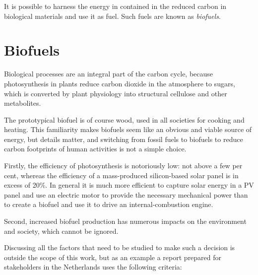It is possible to harness the energy in contained in the reduced carbon in
biological materials and use it as fuel. Such fuels are known as
\textit{biofuels}.

\section{Biofuels}

Biological processes are an integral part of the carbon cycle, because
photosynthesis in plants reduce carbon dioxide in the atmosphere to sugars,
which is converted by plant physiology into structural cellulose and other
metabolites.

The prototypical biofuel is of course wood, used in all societies for cooking
and heating. This familiarity makes biofuels seem like an obvious and viable
source of energy, but details matter, and switching from fossil fuels to
biofuels to reduce carbon footprints of human activities is not a simple choice.

Firstly, the efficiency of photosynthesis is notoriously low: not above a few
per cent, whereas the efficiency of a mass-produced silicon-based solar panel is
in excess of 20\%. In general it is much more efficient to capture solar energy
in a PV panel and use an electric motor to provide the necessary mechanical
power than to create a biofuel and use it to drive an internal-combustion
engine.
 
Second, increased biofuel production has numerous impacts on the environment and
society, which cannot be ignored.

Discussing all the factors that need to be studied to make such a decision is
outside the scope of this work, but as an example a report prepared for
stakeholders in the Netherlands \autocite{Smeets2006} uses the following criteria:

